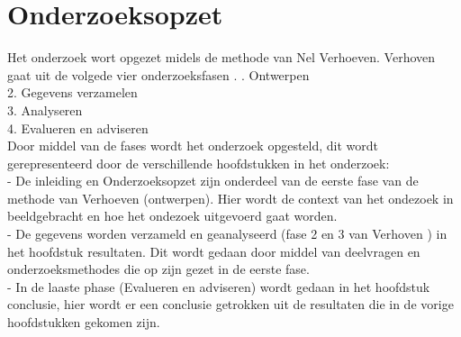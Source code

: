 \section{Onderzoeksopzet}
Het onderzoek wort opgezet midels de methode van Nel Verhoeven. Verhoven gaat uit de volgede vier onderzoeksfasen \Parencite{Verhoeven}.
. Ontwerpen \\
2. Gegevens verzamelen \\
3. Analyseren \\
4. Evalueren en adviseren \\
\whitespace
Door middel van de fases wordt het onderzoek opgesteld, dit wordt gerepresenteerd door de verschillende hoofdstukken in het onderzoek: \\
- De inleiding en Onderzoeksopzet zijn onderdeel van de eerste fase van de methode van Verhoeven (ontwerpen).
Hier wordt de context van het ondezoek in beeldgebracht en hoe het ondezoek uitgevoerd gaat worden. \\ 
- De gegevens worden verzameld en geanalyseerd (fase 2 en 3 van Verhoven \Parencite{Verhoeven}) in het hoofdstuk resultaten.
Dit wordt gedaan door middel van deelvragen en onderzoeksmethodes die op zijn gezet in de eerste fase.\\ 
- In de laaste phase (Evalueren en adviseren) wordt gedaan in het hoofdstuk conclusie, hier wordt er een conclusie getrokken uit de resultaten die in de vorige hoofdstukken gekomen zijn.
